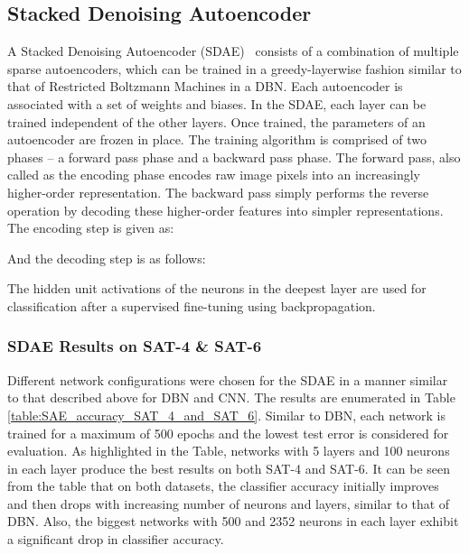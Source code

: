\documentclass[11pt,a4paper]{article}
\begin{document}
\subsection{Stacked Denoising Autoencoder}
A Stacked Denoising Autoencoder (SDAE)~\cite{Vincent:2010} consists of a combination of multiple sparse autoencoders, which can be trained in a greedy-layerwise fashion similar to that of Restricted Boltzmann Machines in a DBN. Each autoencoder is associated with a set of weights and biases. In the SDAE, each layer can be trained independent of the other layers. Once trained, the parameters of an autoencoder are frozen in place. The training algorithm is comprised of two phases -- a forward pass phase and a backward pass phase. The forward pass, also called as the encoding phase encodes raw image pixels into an increasingly higher-order representation. The backward pass simply performs the reverse operation by decoding these higher-order features into simpler representations. 
The encoding step is given as:





And the decoding step is as follows:





The hidden unit activations of the neurons in the deepest layer are used for classification after a supervised fine-tuning using backpropagation.

\subsubsection{SDAE Results on SAT-4 \& SAT-6}
Different network configurations were chosen for the SDAE in a manner similar to that described above for DBN and CNN. The results are enumerated in Table \ref{table:SAE_accuracy_SAT_4_and_SAT_6}. Similar to DBN, each network is trained for a maximum of 500 epochs and the lowest test error is considered for evaluation. As highlighted in the Table, networks with 5 layers and 100 neurons in each layer produce the best results on both SAT-4 and SAT-6. It can be seen from the table that on both datasets, the classifier accuracy initially improves and then drops with increasing number of neurons and layers, similar to that of DBN. Also, the biggest networks with 500 and 2352 neurons in each layer exhibit a significant drop in classifier accuracy.  
\end{document}
